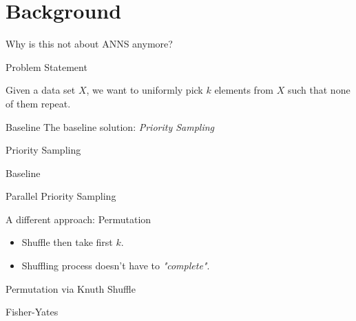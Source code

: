 \section{Background}

\begin{frame}{}
  \begin{center}
    \Large{Why is this not about ANNS anymore?}
  \end{center}
\end{frame}

\begin{frame}{Problem Statement}
  \begin{definition}
    Given a data set \(X\), we want to uniformly pick \(k\) elements from \(X\) such
    that none of them repeat.
  \end{definition}
\end{frame}

\begin{frame}{Baseline}
  The baseline solution: \textit{Priority Sampling}
  \begin{algorithm}[H]
  \caption{Priority Sampling}
  \begin{algorithmic}
  \end{algorithmic}
  \end{algorithm}
\end{frame}

\begin{frame}{Baseline}
  \begin{algorithm}[H]
  \caption{Parallel Priority Sampling}
  \begin{algorithmic}
  \end{algorithmic}
  \end{algorithm}
\end{frame}

\begin{frame}{A different approach: Permutation}
  \begin{itemize}
    \item Shuffle then take first \(k\).
    \item Shuffling process doesn't have to \textit{"complete"}.
  \end{itemize}
\end{frame}

\begin{frame}{Permutation via Knuth Shuffle}
  \begin{algorithm}[H]
  \caption{Fisher-Yates}
  \begin{algorithmic}
  \end{algorithmic}
  \end{algorithm}
\end{frame}


